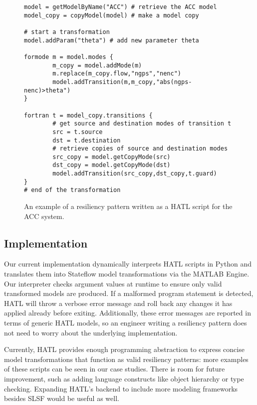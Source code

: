 %
\begin{figure}[!t]%
\begin{lstlisting}[basicstyle=\ttfamily\footnotesize, numbers=none]
model = getModelByName("ACC") # retrieve the ACC model
model_copy = copyModel(model) # make a model copy 

# start a transformation  
model.addParam("theta") # add new parameter theta

formode m = model.modes {
		m_copy = model.addMode(m)
		m.replace(m_copy.flow,"ngps","nenc")
		model.addTransition(m,m_copy,"abs(ngps-nenc)>theta")
}

fortran t = model_copy.transitions {
		# get source and destination modes of transition t
		src = t.source
		dst = t.destination
		# retrieve copies of source and destination modes
		src_copy = model.getCopyMode(src)
		dst_copy = model.getCopyMode(dst)
		model.addTransition(src_copy,dst_copy,t.guard)
}
# end of the transformation
\end{lstlisting}
\caption{An example of a resiliency pattern written as a HATL script for the ACC system.}%
%
\end{figure}

\subsection{Implementation}

Our current implementation dynamically interprets HATL scripts in
Python and translates them into Stateflow model transformations via
the MATLAB Engine. Our interpreter checks argument values at runtime
to ensure only valid transformed models are produced. If a malformed
program statement is detected, HATL will throw a verbose error message
and roll back any changes it has applied already before
exiting. Additionally, these error messages are reported in terms of
generic HATL models, so an engineer writing a resiliency pattern does
not need to worry about the underlying implementation.

Currently, HATL provides enough programming abstraction to express concise model transformations that function as valid resiliency patterns: more examples of these scripts can be seen in our case studies. There is room for future improvement, such as adding language constructs like object hierarchy or type checking. Expanding HATL's backend to include more modeling frameworks besides SLSF would be useful as well.












